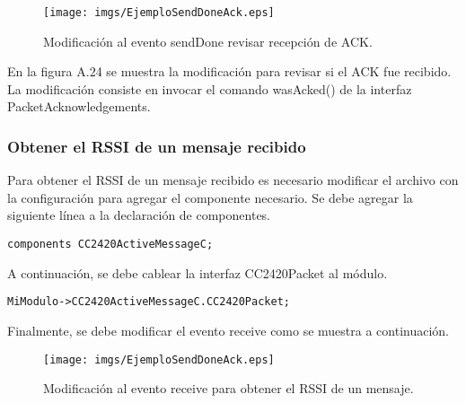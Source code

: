 \begin{center}
\begin{figure}[H]
\centering
\texttt{[image: imgs/EjemploSendDoneAck.eps]} 
\caption{Modificación al evento sendDone revisar recepción de ACK.}
\end{figure}
\end{center}

En la figura A.24 se muestra la modificación para revisar si el ACK fue recibido. La modificación consiste en invocar el comando wasAcked() de la interfaz PacketAcknowledgements.

\subsubsection{Obtener el RSSI de un mensaje recibido}
Para obtener el RSSI de un mensaje recibido es necesario modificar el archivo con la configuración para agregar el componente necesario. Se debe agregar la siguiente línea a la declaración de componentes.

\begin{verbatim}
components CC2420ActiveMessageC;
\end{verbatim}

A continuación, se debe cablear la interfaz CC2420Packet al módulo.

\begin{verbatim}
MiModulo->CC2420ActiveMessageC.CC2420Packet;
\end{verbatim}

Finalmente, se debe modificar el evento receive como se muestra a continuación.

\begin{center}
\begin{figure}[H]
\centering
\texttt{[image: imgs/EjemploSendDoneAck.eps]} 
\caption{Modificación al evento receive para obtener el RSSI de un mensaje.}
\end{figure}
\end{center}


